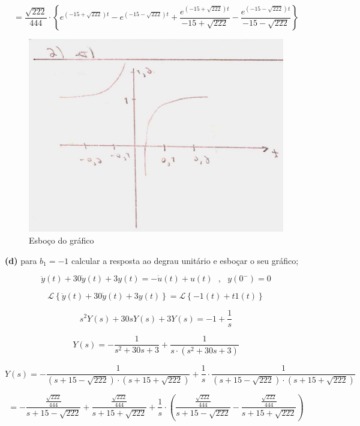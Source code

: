 \documentclass{article}
\begin{document}
\[ = \frac{\sqrt{222}}{444} \cdot \left\{ e^{(-15+\sqrt{222})t} - e^{(-15-\sqrt{222})t} + \frac{e^{(-15+\sqrt{222})t}}{-15+\sqrt{222}} - \frac{e^{(-15-\sqrt{222})t}}{-15-\sqrt{222}} \right\} \]

\begin{figure}[h]
    \includegraphics[scale=0.21]{Q2_c.png}
    \centering
    \caption{Esboço do gráfico}
\end{figure}

\vspace{\baselineskip}

\textbf{(d)} para $b_1 = -1$ calcular a resposta ao degrau unitário e esboçar o seu gráfico;

\vspace{\baselineskip}

\[\ddot{y}(t) + 30\dot{y}(t) + 3y(t) = - \dot{u}(t) + u(t)\,\,\,\,,\,\,\,\,y(0^{-}) = 0\]

\[\mathcal{L} \left\{\ddot{y}(t) + 30\dot{y}(t) + 3y(t)\right\} = \mathcal{L} \left\{- 1(t) + t1(t)\right\}\]

\[ s^{2}Y(s) + 30sY(s) + 3Y(s) = - 1 + \frac{1}{s} \]

\[ Y(s) = - \frac{1}{s^{2} + 30s + 3} + \frac{1}{s \cdot (s^{2} + 30s + 3)}\]

\[ Y(s) = - \frac{1}{(s + 15 - \sqrt{222}) \cdot (s + 15 + \sqrt{222})} + \frac{1}{s} \cdot \frac{1}{(s + 15 - \sqrt{222}) \cdot (s + 15 + \sqrt{222})}\]

\[  = - \frac{ \frac{\sqrt{222}}{444}}{s + 15 - \sqrt{222}} + \frac{\frac{\sqrt{222}}{444}}{s + 15 + \sqrt{222}} + \frac{1}{s} \cdot \left(\frac{ \frac{\sqrt{222}}{444}}{s + 15 - \sqrt{222}} - \frac{\frac{\sqrt{222}}{444}}{s + 15 + \sqrt{222}}\right) \]
\end{document}
